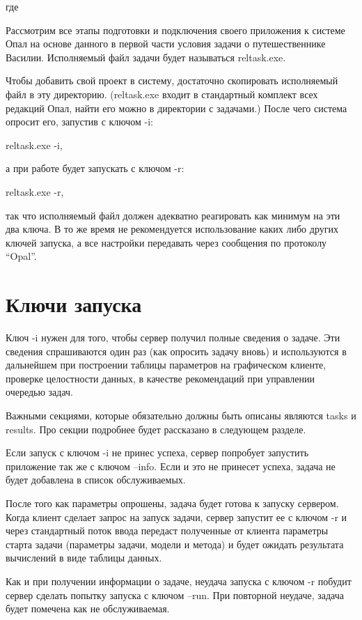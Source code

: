 
где %

Рассмотрим все этапы подготовки и подключения своего приложения к системе Опал на основе данного в первой части условия задачи о путешественнике Василии. Исполняемый файл задачи будет называться reltask.exe.

Чтобы добавить свой проект в систему, достаточно скопировать исполняемый файл в эту директорию. (reltask.exe входит в стандартный комплект всех редакций Опал, найти его можно в директории с задачами.) После чего система опросит его, запустив с ключом -i:

reltask.exe -i,

а при работе будет запускать с ключом -r:

reltask.exe -r,

так что исполняемый файл должен адекватно реагировать как минимум на эти два ключа. В то же время не рекомендуется использование каких либо других ключей запуска, а все настройки передавать через сообщения по протоколу “Opal”.

\section{Ключи запуска}

Ключ -i нужен для того, чтобы сервер получил полные сведения о задаче. Эти сведения спрашиваются один раз (как опросить задачу вновь) и используются в дальнейшем при построении таблицы параметров на графическом клиенте, проверке целостности данных, в качестве рекомендаций при управлении очередью задач.

Важными секциями, которые обязательно должны быть описаны являются tasks и results. Про секции подробнее будет рассказано в следующем разделе.

Если запуск с ключом -i не принес успеха, сервер попробует запустить приложение так же с ключом --info. Если и это не принесет успеха, задача не будет добавлена в список обслуживаемых.

После того как параметры опрошены, задача будет готова к запуску сервером. Когда клиент сделает запрос на запуск задачи, сервер запустит ее с ключом -r и через стандартный поток ввода передаст полученные от клиента параметры старта задачи (параметры задачи, модели и метода) и будет ожидать результата вычислений в виде таблицы данных.

Как и при получении информации о задаче, неудача запуска с ключом -r побудит сервер сделать попытку запуска с ключом --run. При повторной неудаче, задача будет помечена как не обслуживаемая.

